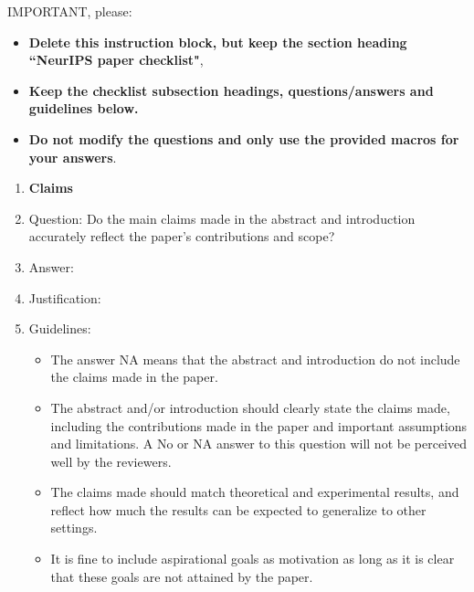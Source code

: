 \documentclass{article}
\begin{document}
IMPORTANT, please:
\begin{itemize}
    \item {\bf Delete this instruction block, but keep the section heading ``NeurIPS paper checklist"},
    \item  {\bf Keep the checklist subsection headings, questions/answers and guidelines below.}
    \item {\bf Do not modify the questions and only use the provided macros for your answers}.
\end{itemize} 
 



\begin{enumerate}

\item {\bf Claims}
    \item[] Question: Do the main claims made in the abstract and introduction accurately reflect the paper's contributions and scope?
    \item[] Answer: \answerTODO{} %
    \item[] Justification: \justificationTODO{}
    \item[] Guidelines:
    \begin{itemize}
        \item The answer NA means that the abstract and introduction do not include the claims made in the paper.
        \item The abstract and/or introduction should clearly state the claims made, including the contributions made in the paper and important assumptions and limitations. A No or NA answer to this question will not be perceived well by the reviewers. 
        \item The claims made should match theoretical and experimental results, and reflect how much the results can be expected to generalize to other settings. 
        \item It is fine to include aspirational goals as motivation as long as it is clear that these goals are not attained by the paper. 
    \end{itemize}


\end{enumerate}
\end{document}

